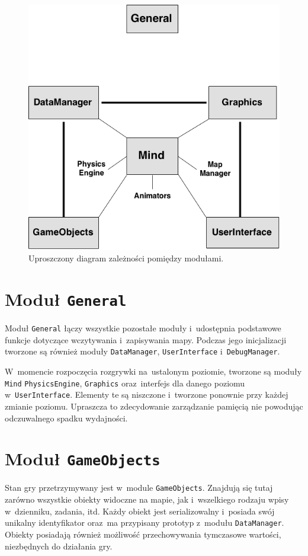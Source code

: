 \documentclass[licencjacka]{pracamgr}
\begin{document}
    \begin{figure}[htbp]
      \centering
      \includegraphics[scale=0.5]{diagram-klas.png}
      \caption{Uproszczony diagram zależności pomiędzy modułami.}
    \end{figure}

  \section{Moduł \texttt{General}}
    Moduł \texttt{General} łączy wszystkie pozostałe moduły i~udostępnia podstawowe funkcje dotyczące wczytywania
    i~zapisywania mapy. Podczas jego inicjalizacji tworzone są również moduły \texttt{DataManager}, \texttt{UserInterface}
    i~\texttt{DebugManager}.

    W~momencie rozpoczęcia rozgrywki na~ustalonym poziomie, tworzone są moduły \texttt{Mind} \texttt{PhysicsEngine},
    \texttt{Graphics} oraz~interfejs dla danego poziomu w~\texttt{UserInterface}. Elementy te są niszczone i~tworzone
    ponownie przy każdej zmianie poziomu. Upraszcza to zdecydowanie zarządzanie pamięcią nie powodując odczuwalnego spadku
    wydajności.

  \section{Moduł \texttt{GameObjects}}
    Stan gry przetrzymywany jest w~module \texttt{GameObjects}. Znajdują się tutaj zarówno wszystkie obiekty widoczne na
    mapie, jak i~wszelkiego rodzaju wpisy w~dzienniku, zadania, itd. Każdy obiekt jest serializowalny i~posiada swój
    unikalny identyfikator oraz~ma przypisany prototyp z~modułu \texttt{DataManager}. Obiekty posiadają również możliwość
    przechowywania tymczasowe wartości, niezbędnych do działania gry.
\end{document}
